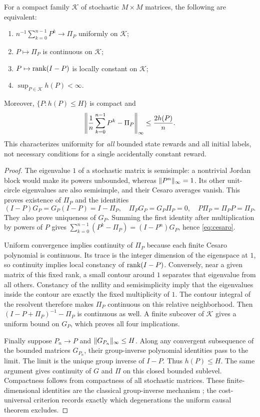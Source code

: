 \begin{theorem}\label{thm:regularity}
For a compact family $\mathcal K$ of stochastic $M\times M$ matrices, the following are equivalent:
\begin{enumerate}
\item $n^{-1}\sum_{k=0}^{n-1}P^k\to\Pi_P$ uniformly on $\mathcal K$;
\item $P\mapsto\Pi_P$ is continuous on $\mathcal K$;
\item $P\mapsto\operatorname{rank}(I-P)$ is locally constant on $\mathcal K$;
\item $\sup_{P\in\mathcal K}h(P)<\infty$.
\end{enumerate}
Moreover, $\{P:h(P)\le H\}$ is compact and
\begin{equation}\label{eq:cesaro}
 \left\|{1\over n}\sum_{k=0}^{n-1}P^k-\Pi_P\right\|_\infty
 \le {2h(P)\over n}.
\end{equation}
This characterizes uniformity for \emph{all} bounded state rewards and all initial labels, not necessary conditions for a single accidentally constant reward.
\end{theorem}
\begin{proof}
The eigenvalue $1$ of a stochastic matrix is semisimple: a nontrivial Jordan block would make its powers unbounded, whereas $\lVert P^n\rVert_\infty=1$. Its other unit-circle eigenvalues are also semisimple, and their Cesaro averages vanish. This proves existence of $\Pi_P$ and the identities
\[
 (I-P)G_P=G_P(I-P)=I-\Pi_P,\quad
 \Pi_PG_P=G_P\Pi_P=0,\quad P\Pi_P=\Pi_PP=\Pi_P.
\]
They also prove uniqueness of $G_P$. Summing the first identity after multiplication by powers of $P$ gives
$\sum_{k=0}^{n-1}(P^k-\Pi_P)=(I-P^n)G_P$, hence \eqref{eq:cesaro}.

Uniform convergence implies continuity of $\Pi_P$ because each finite Cesaro polynomial is continuous. Its trace is the integer dimension of the eigenspace at $1$, so continuity implies local constancy of $\operatorname{rank}(I-P)$. Conversely, near a given matrix of this fixed rank, a small contour around $1$ separates that eigenvalue from all others. Constancy of the nullity and semisimplicity imply that the eigenvalues inside the contour are exactly the fixed multiplicity of $1$. The contour integral of the resolvent therefore makes $\Pi_P$ continuous on this relative neighborhood. Then $(I-P+\Pi_P)^{-1}-\Pi_P$ is continuous as well. A finite subcover of $\mathcal K$ gives a uniform bound on $G_P$, which proves all four implications.

Finally suppose $P_n\to P$ and $\lVert G_{P_n}\rVert_\infty\le H$. Along any convergent subsequence of the bounded matrices $G_{P_n}$, their group-inverse polynomial identities pass to the limit. The limit is the unique group inverse of $I-P$. Thus $h(P)\le H$. The same argument gives continuity of $G$ and $\Pi$ on this closed bounded sublevel. Compactness follows from compactness of all stochastic matrices. These finite-dimensional identities are the classical group-inverse mechanism \cite{Meyer}; the cost-universal criterion records exactly which degenerations the uniform causal theorem excludes.
\end{proof}

